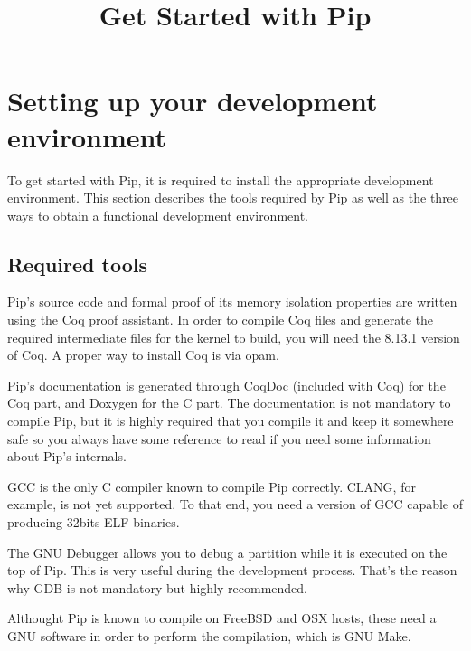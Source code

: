 \documentclass[10pt,a4paper,titlepage]{refart}
\title{Get Started with Pip}
\begin{document}
\maketitle

\tableofcontents

\pagebreak

\section{Setting up your development environment}

To get started with Pip, it is required to install the appropriate development
environment. This section describes the tools required by Pip as well as the
three ways to obtain a functional development environment.

\subsection{Required tools}

 
Pip's source code and formal proof of its memory isolation properties are
written using the Coq proof assistant. In order to compile Coq files and
generate the required intermediate files for the kernel to build, you will need
the 8.13.1 version of Coq. A proper way to install Coq is via opam.

 
Pip's documentation is generated through CoqDoc (included with Coq) for the Coq
part, and Doxygen for the C part. The documentation is not mandatory to compile
Pip, but it is highly required that you compile it and keep it somewhere safe so
you always have some reference to read if you need some information about Pip's
internals.

 
GCC is the only C compiler known to compile Pip correctly. CLANG, for example,
is not yet supported. To that end, you need a version of GCC capable of
producing 32bits ELF binaries.

 
The GNU Debugger allows you to debug a partition while it is executed on the
top of Pip. This is very useful during the development process. That's the
reason why GDB is not mandatory but highly recommended.

 
Althought Pip is known to compile on FreeBSD and OSX hosts, these need a GNU
software in order to perform the compilation, which is GNU Make.
\end{document}
